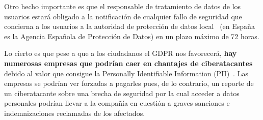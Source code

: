 Otro hecho importante es que el responsable de tratamiento de datos de los usuarios estará obligado a la notificación de cualquier fallo de seguridad que concierna a los usuarios a la autoridad de protección de datos local~\cite{article:AEPD} (en España es la Agencia Española de Protección de Datos) en un plazo máximo de 72 horas.

Lo cierto es que pese a que a los ciudadanos el GDPR nos favorecerá, \textbf{hay numerosas empresas que podrían caer en chantajes de ciberatacantes} debido al valor que consigue la Personally Identifiable Information (PII)~\cite{article:chantajeGDPR}. Las empresas se podrían ver forzadas a pagarles pues, de lo contrario, un reporte de un ciberatacante sobre una brecha de seguridad por la cual acceder a datos personales podrían llevar a la compañía en cuestión a graves sanciones e indemnizaciones reclamadas de los afectados.

 

